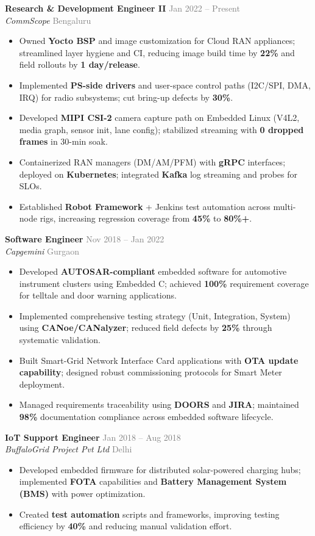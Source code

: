 \documentclass[11pt,a4paper]{article}
\newcommand{\ressubsection}[4]{\textbf{#1} \hfill \textcolor{gray}{#2} \\ \textit{#3} \hfill \textcolor{gray}{#4}}
\begin{document}
\ressubsection{Research \& Development Engineer II}{Jan 2022 -- Present}{CommScope}{Bengaluru}
\begin{itemize}[leftmargin=15pt,topsep=2pt,itemsep=1pt]
\item Owned \textbf{Yocto BSP} and image customization for Cloud RAN appliances; streamlined layer hygiene and CI, reducing image build time by \textbf{22\%} and field rollouts by \textbf{1 day/release}.
\item Implemented \textbf{PS-side drivers} and user-space control paths (I2C/SPI, DMA, IRQ) for radio subsystems; cut bring-up defects by \textbf{30\%}.
\item Developed \textbf{MIPI CSI-2} camera capture path on Embedded Linux (V4L2, media graph, sensor init, lane config); stabilized streaming with \textbf{0 dropped frames} in 30-min soak.
\item Containerized RAN managers (DM/AM/PFM) with \textbf{gRPC} interfaces; deployed on \textbf{Kubernetes}; integrated \textbf{Kafka} log streaming and probes for SLOs.
\item Established \textbf{Robot Framework} + Jenkins test automation across multi-node rigs, increasing regression coverage from \textbf{45\%} to \textbf{80\%+}.
\end{itemize}

\ressubsection{Software Engineer}{Nov 2018 -- Jan 2022}{Capgemini}{Gurgaon}
\begin{itemize}[leftmargin=15pt,topsep=2pt,itemsep=1pt]
\item Developed \textbf{AUTOSAR-compliant} embedded software for automotive instrument clusters using Embedded C; achieved \textbf{100\%} requirement coverage for telltale and door warning applications.
\item Implemented comprehensive testing strategy (Unit, Integration, System) using \textbf{CANoe/CANalyzer}; reduced field defects by \textbf{25\%} through systematic validation.
\item Built Smart-Grid Network Interface Card applications with \textbf{OTA update capability}; designed robust commissioning protocols for Smart Meter deployment.
\item Managed requirements traceability using \textbf{DOORS} and \textbf{JIRA}; maintained \textbf{98\%} documentation compliance across embedded software lifecycle.
\end{itemize}

\ressubsection{IoT Support Engineer}{Jan 2018 -- Aug 2018}{BuffaloGrid Project Pvt Ltd}{Delhi}
\begin{itemize}[leftmargin=15pt,topsep=2pt,itemsep=1pt]
\item Developed embedded firmware for distributed solar-powered charging hubs; implemented \textbf{FOTA} capabilities and \textbf{Battery Management System (BMS)} with power optimization.
\item Created \textbf{test automation} scripts and frameworks, improving testing efficiency by \textbf{40\%} and reducing manual validation effort.
\end{itemize}
\end{document}
